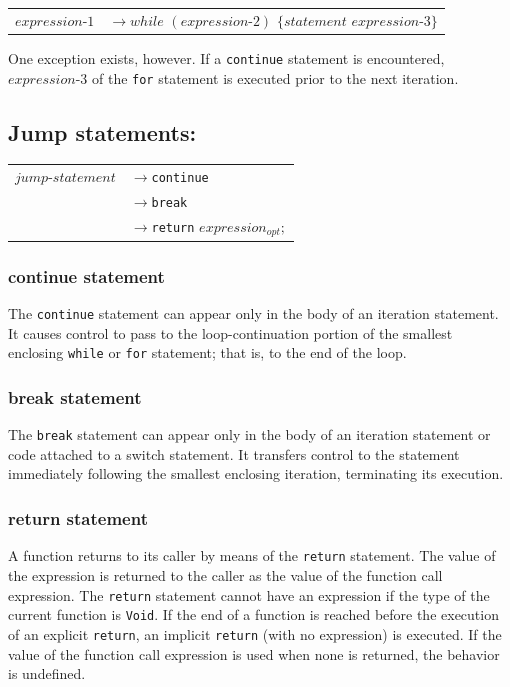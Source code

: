 \documentclass[12pt,A4]{book}
\begin{document}
\begin{tabular}{l l}
$expression\mbox{-}1$  & $\rightarrow while$ $(expression\mbox{-}2)$ $\{statement$ $expression\mbox{-}3\}$\\
\end{tabular}

One exception exists, however.  If a \verb|continue| statement is encountered, $expression\mbox{-}3$ of the \verb|for| statement is executed prior to the next iteration.
\subsection{Jump statements:}

\begin{tabular}{l l}
$jump\mbox{-}statement$ & $\rightarrow$\verb|continue|\\
                & $\rightarrow$\verb|break|\\
                & $\rightarrow$\verb|return| $expression_{opt};$
\end{tabular}

\subsubsection{continue statement}
The \verb|continue| statement can appear only in the body of an iteration statement.  It causes control to pass to the loop-continuation portion of the smallest enclosing \verb|while| or \verb|for| statement; that is, to the end of the loop.
\subsubsection{break statement}
The \verb|break| statement can appear only in the body of an iteration statement or code attached to a switch statement. It transfers control to the statement immediately following the smallest enclosing iteration, terminating its execution.
\subsubsection{return statement}
A function returns to its caller by means of the \verb|return| statement. The value of the expression is returned to the caller as the value of the function call expression. The \verb|return| statement cannot have an expression if the type of the current function is \verb|Void|.
If the end of a function is reached before the execution of an explicit \verb|return|, an implicit \verb|return| (with no expression) is executed. If the value of the function call expression is used when none is returned, the behavior is undefined.
\end{document}
